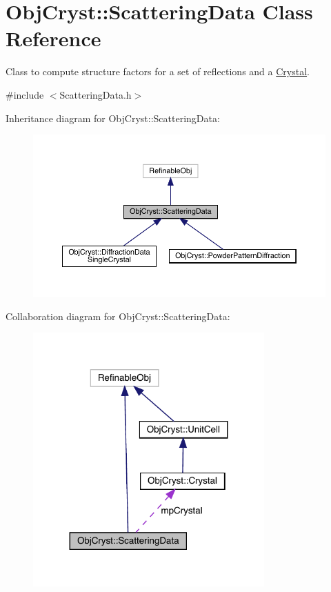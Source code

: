 \hypertarget{class_obj_cryst_1_1_scattering_data}{}\section{Obj\+Cryst\+::Scattering\+Data Class Reference}
\label{class_obj_cryst_1_1_scattering_data}


Class to compute structure factors for a set of reflections and a \mbox{\hyperlink{class_obj_cryst_1_1_crystal}{Crystal}}.  




{\ttfamily \#include $<$Scattering\+Data.\+h$>$}



Inheritance diagram for Obj\+Cryst\+::Scattering\+Data\+:
\nopagebreak
\begin{figure}[H]
\begin{center}
\leavevmode
\includegraphics[width=350pt]{class_obj_cryst_1_1_scattering_data__inherit__graph}
\end{center}
\end{figure}


Collaboration diagram for Obj\+Cryst\+::Scattering\+Data\+:
\nopagebreak
\begin{figure}[H]
\begin{center}
\leavevmode
\includegraphics[width=251pt]{class_obj_cryst_1_1_scattering_data__coll__graph}
\end{center}
\end{figure}
